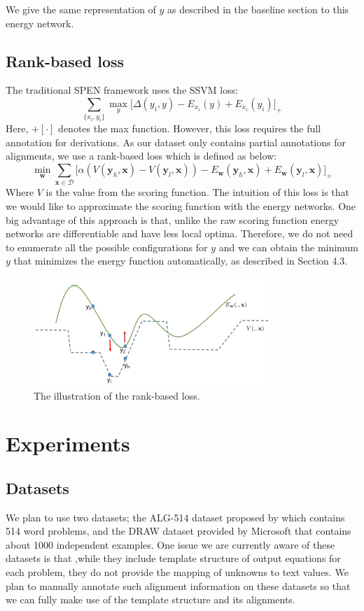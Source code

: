 \documentclass[11pt,letterpaper]{article}
\begin{document}
We give the same representation of $y$ as described in the baseline section to this energy network.
\subsection{Rank-based loss}
The traditional SPEN framework uses the SSVM loss:
\begin{equation}
\sum_{ \{x_i,y_i\} } \max_y \big[ \Delta(y_i, y) - E_{x_i}(y) + E_{x_i}(y_i) \big]_+
\end{equation}
Here, $+[ \cdot ]$ denotes the max function. However, this loss requires the full annotation for derivations. As our dataset only contains partial annotations for alignments, we use a rank-based loss which is defined as below:
{ \small
\begin{equation}
\min_\mathbf{w} \sum_{ \mathbf{x} \in \mathcal{D} } \big[ \alpha(V(\mathbf{y}_h, \mathbf{x}) - V(\mathbf{y}_l, \mathbf{x})) - E_{\mathbf{w}}(\mathbf{y}_h, \mathbf{x}) + E_{\mathbf{w}}(\mathbf{y}_l, \mathbf{x})  \big]_+
\end{equation}
}
Where $V$ is the value from the scoring function. The intuition of this loss is that we would like to approximate the scoring function with the energy networks. One big advantage of this approach is that, unlike the raw scoring function energy networks are differentiable and have less local optima. Therefore, we do not need to enumerate all the possible configurations for $y$ and we can obtain the minimum $y$ that minimizes the energy function automatically, as described in Section 4.3.
%
\begin{figure}[ht]
	\centering
	\includegraphics[bb=0 0 338 154, scale=0.5]{rank-based_loss}
    \caption{The illustration of the rank-based loss.}
    \label{spen-architecture}
\end{figure}
\section{Experiments}
\subsection{Datasets}
We plan to use two datasets; the ALG-514 dataset proposed by \cite{Kushman2014LearningTA} which contains 514 word problems, and the DRAW dataset provided by Microsoft that contains about 1000 independent examples. One issue we are currently aware of these datasets is that ,while they include template structure of output equations for each problem, they do not provide the mapping of unknowns to text values. We plan to manually annotate such alignment information on these datasets so that we can fully make use of the template structure and its alignments.
\end{document}
